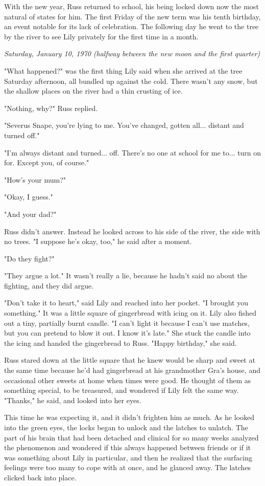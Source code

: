 \documentclass[a4paper,11pt]{article}
\begin{document}
With the new year, Russ returned to school, his being locked down now the most natural of states for him. The first Friday of the new term was his tenth birthday, an event notable for its lack of celebration. The following day he went to the tree by the river to see Lily privately for the first time in a month.

\emph{Saturday, January 10, 1970 (halfway between the new moon and the first quarter)}

"What happened?" was the first thing Lily said when she arrived at the tree Saturday afternoon, all bundled up against the cold. There wasn't any snow, but the shallow places on the river had a thin crusting of ice.

"Nothing, why?" Russ replied.

"Severus Snape, you're lying to me. You've changed, gotten all... distant and turned off."

"I'm always distant and turned... off. There's no one at school for me to... turn on for. Except you, of course."

"How's your mum?"

"Okay, I guess."

"And your dad?"

Russ didn't answer. Instead he looked across to his side of the river, the side with no trees. "I suppose he's okay, too," he said after a moment.

"Do they fight?"

"They argue a lot." It wasn't really a lie, because he hadn't said no about the fighting, and they did argue.

"Don't take it to heart," said Lily and reached into her pocket. "I brought you something." It was a little square of gingerbread with icing on it. Lily also fished out a tiny, partially burnt candle. "I can't light it because I can't use matches, but you can pretend to blow it out. I know it's late." She stuck the candle into the icing and handed the gingerbread to Russ. "Happy birthday," she said.

Russ stared down at the little square that he knew would be sharp and sweet at the same time because he'd had gingerbread at his grandmother Gra's house, and occasional other sweets at home when times were good. He thought of them as something special, to be treasured, and wondered if Lily felt the same way. "Thanks," he said, and looked into her eyes.

This time he was expecting it, and it didn't frighten him as much. As he looked into the green eyes, the locks began to unlock and the latches to unlatch. The part of his brain that had been detached and clinical for so many weeks analyzed the phenomenon and wondered if this always happened between friends or if it was something about Lily in particular, and then he realized that the surfacing feelings were too many to cope with at once, and he glanced away. The latches clicked back into place.
\end{document}
